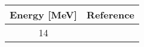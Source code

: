 \begin{tabular}{|c||c|} 
    \hline 
    \bf{Energy [MeV]} & \bf{Reference} \\
    \hline
    \hline 
    14 & \cite{Haas63}\\
    \hline
\end{tabular}
